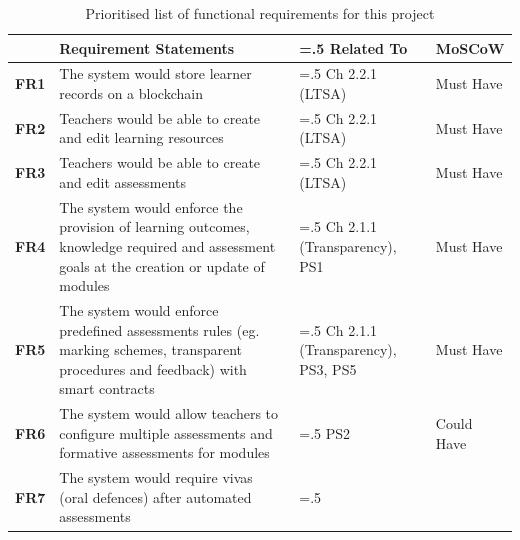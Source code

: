 \begin{table}[!h]
	\caption{Prioritised list of functional requirements for this project}
	\centering
	\label{table:fx-reqs}
	\begin{tabularx}{\textwidth}{>{\bfseries}l>{\hsize=1.5\hsize}X>{\hsize=.5\hsize}Xl}
		                                                          & Requirement Statements                                                            & Related To  & MoSCoW \\
		\toprule
		FR1                                                       & The system would store learner records on a blockchain
		                                                          & Ch 2.2.1 (LTSA)                                                                   & Must Have
		\\\midrule
		FR2                                                       & Teachers would be able to create and edit learning resources
		                                                          & Ch 2.2.1 (LTSA)                                                                   & Must Have
		\\\midrule
		FR3                                                       & Teachers would be able to create and edit assessments
		                                                          & Ch 2.2.1 (LTSA)                                                                   & Must Have
		\\\midrule
		FR4                                                       & The system would enforce the provision of learning outcomes, knowledge required
		and assessment goals at the creation or update of modules & Ch 2.1.1 (Transparency),
		PS1                                                       & Must Have
		\\\midrule
		FR5                                                       & The system would enforce predefined assessments rules (eg. marking schemes,
		transparent procedures and feedback) with smart contracts
		                                                          & Ch 2.1.1 (Transparency), PS3, PS5                                                 & Must Have
		\\\midrule
		FR6                                                       & The system would allow teachers to configure multiple assessments and
		formative assessments for modules                         & PS2                                                                               & Could Have
		\\\midrule
		FR7                                                       & The system would require vivas (oral defences) after automated assessments        &

\end{tabularx}
\end{table}
